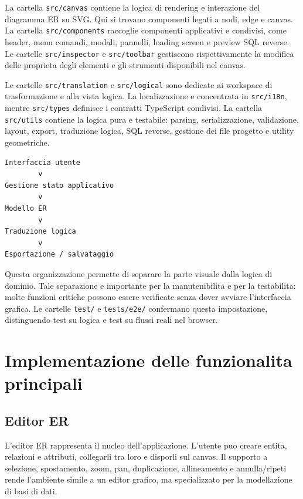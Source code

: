 La cartella \texttt{src/canvas} contiene la logica di rendering e interazione del diagramma ER su SVG. Qui si trovano componenti legati a nodi, edge e canvas. La cartella \texttt{src/components} raccoglie componenti applicativi e condivisi, come header, menu comandi, modali, pannelli, loading screen e preview SQL reverse. Le cartelle \texttt{src/inspector} e \texttt{src/toolbar} gestiscono rispettivamente la modifica delle proprieta degli elementi e gli strumenti disponibili nel canvas.

Le cartelle \texttt{src/translation} e \texttt{src/logical} sono dedicate ai workspace di trasformazione e alla vista logica. La localizzazione e concentrata in \texttt{src/i18n}, mentre \texttt{src/types} definisce i contratti TypeScript condivisi. La cartella \texttt{src/utils} contiene la logica pura e testabile: parsing, serializzazione, validazione, layout, export, traduzione logica, SQL reverse, gestione dei file progetto e utility geometriche.

\begin{verbatim}
Interfaccia utente
        v
Gestione stato applicativo
        v
Modello ER
        v
Traduzione logica
        v
Esportazione / salvataggio
\end{verbatim}

Questa organizzazione permette di separare la parte visuale dalla logica di dominio. Tale separazione e importante per la manutenibilita e per la testabilita: molte funzioni critiche possono essere verificate senza dover avviare l'interfaccia grafica. Le cartelle \texttt{test/} e \texttt{tests/e2e/} confermano questa impostazione, distinguendo test su logica e test su flussi reali nel browser.

\section{Implementazione delle funzionalita principali}

\subsection{Editor ER}

L'editor ER rappresenta il nucleo dell'applicazione. L'utente puo creare entita, relazioni e attributi, collegarli tra loro e disporli sul canvas. Il supporto a selezione, spostamento, zoom, pan, duplicazione, allineamento e annulla/ripeti rende l'ambiente simile a un editor grafico, ma specializzato per la modellazione di basi di dati.

